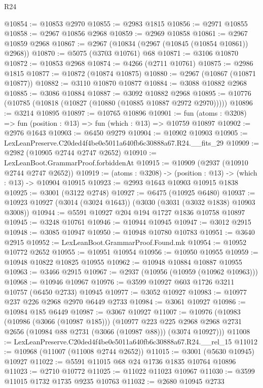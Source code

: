 \begin{lexlean}{R24}
\begin{coremodule}
@10854 := @10853 @2970
@10855 := @2983 @1815
@10856 := @2971 @10855
@10858 := @2967 @10856 @2968
@10859 := @2969 @10858
@10861 := @2967 @10859 @2968
@10867 := @2967 (@10834 (@2967 (@10845 (@10854 @10861)) @2968))
@10870 := @5075 (@3703 @10761) @68
@10871 := @3106 @10870
@10872 := @10853 @2968
@10874 := @4266 (@2711 @10761)
@10875 := @2986 @1815
@10877 := @10872 (@10874 @10875)
@10880 := @2967 (@10867 (@10871 @10877))
@10882 := @3110 @10870 @10877
@10884 := @3088 @10882 @2968
@10885 := @3086 @10884
@10887 := @3092 @10882 @2968
@10895 := @10776 (@10785 (@10818 (@10827 (@10880 (@10885 @10887 @2972 @2970)))))
@10896 := @3214 @10895
@10897 := @10765 @10896
@10901 := fun (atoms : @3208) => fun (position : @13) => fun (which : @13) => @10759 @10897
@10902 := @2976 @1643
@10903 := @6450 @9279
@10904 := @10902 @10903
@10905 := LexLeanPreserve.C20ded4f4be0e5011a640fb6c30888a67.R24.__fits_29
@10909 := @2982 (@10905 @2744 @2747 @2652)
@10910 := LexLeanBoot.GrammarProof.forbiddenAt
@10915 := @10909 (@2937 (@10910 @2744 @2747 @2652))
@10919 := (atoms : @3208) -> (position : @13) -> (which : @13) -> @10904 @10915
@10923 := @2993 @1643 @10903 @10915 @1838
@10925 := @3001 (@3122 @2748)
@10927 := @6475 (@10925 @6480)
@10937 := @10923 @10927 (@3014 (@3024 @1643)) (@3030 (@3031 (@3032 @1838) @10903 @3008))
@10944 := @5591 @10927 @204 @194 @1727 @1836 @10758 @10897
@10945 := @3248 @10761
@10946 := @10944 @10945
@10947 := @3012 @2915
@10948 := @3085 @10947
@10950 := @10948 @10780 @10783
@10951 := @3640 @2915
@10952 := LexLeanBoot.GrammarProof.Found.mk
@10954 := @10952 @10772 @2652
@10955 := @10951 @10954
@10956 := @10950 @10955
@10959 := @10948 @10822 @10825 @10955
@10962 := @10948 @10884 @10887 @10955
@10963 := @3466 @2915
@10967 := @2937 (@10956 (@10959 (@10962 @10963)))
@10968 := @10946 @10967
@10976 := @3599 @10927 @603 @1726 @3211 @10757 (@6450 @2733) @10945
@10977 := @3052 @10927
@10983 := @10977 @237 @226 @2968 @2970 @6449 @2733
@10984 := @3061 @10927
@10986 := @10984 @185 @6449
@10987 := @3067 @10927
@11007 := @10976
    (@10983
      (@10986 (@3066 (@10987 @185)))
      (@10977
        @223
        @225
        @2968
        @2968
        @2731
        @2656
        (@10984 @88 @2731 (@3066 (@10987 @88)))
        (@3074 @10927)))
@11008 := LexLeanPreserve.C20ded4f4be0e5011a640fb6c30888a67.R24.__rel_15
@11012 := @10968 (@11007 (@11008 @2744 @2652))
@11015 := @3001 (@5630 @10945) @10927
@11022 := @5591 @11015 @68 @24 @1736 @1835 @10764 @10896
@11023 := @2710 @10772
@11025 := @11022 @11023 @10967
@11030 := @3599 @11015 @1732 @1735 @9235 @10763
@11032 := @2680 @10945 @2733

\end{coremodule}
\end{lexlean}
